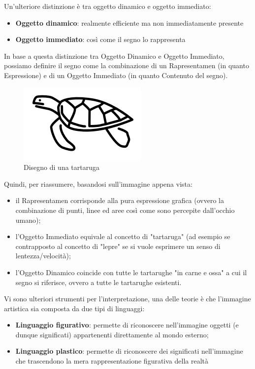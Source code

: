 \documentclass[11pt,a4paper]{article}
\begin{document}
Un'ulteriore distinzione è tra oggetto dinamico e oggetto immediato:
\begin{itemize}
	\item \textbf{Oggetto dinamico}: realmente efficiente ma non immediatamente presente
	\item \textbf{Oggetto immediato}: così come il segno lo rappresenta
\end{itemize}
In base a questa distinzione tra Oggetto Dinamico e Oggetto Immediato, possiamo definire il segno come la combinazione di un Rapresentamen (in quanto Espressione) e di un Oggetto Immediato (in quanto Contenuto del segno).
\begin{figure}
	\begin{center}
		\includegraphics[scale=0.6]{img/009.png}
	\end{center}
	\caption{Disegno di una tartaruga}
\end{figure}
Quindi, per riassumere, basandosi sull'immagine appena vista:
\begin{itemize}
	\item il Rapresentamen corrisponde alla pura espressione grafica (ovvero la combinazione di punti, linee ed aree così come sono percepite dall'occhio umano);
	\item l'Oggetto Immediato equivale al concetto di "tartaruga" (ad esempio se contrapposto al concetto di "lepre" se si vuole esprimere un senso di lentezza/velocità);
	\item l'Oggetto Dinamico coincide con tutte le tartarughe "in carne e ossa" a cui il segno si riferisce, ovvero a tutte le tartarughe esistenti.
\end{itemize}
Vi sono ulteriori strumenti per l'interpretazione, una delle teorie è che l'immagine artistica sia composta da due tipi di linguaggi:
\begin{itemize}
	\item \textbf{Linguaggio figurativo}:  permette di riconoscere nell'immagine oggetti (e dunque significati) appartenenti direttamente al mondo esterno;
	\item \textbf{Linguaggio plastico}: permette di riconoscere dei significati nell'immagine che trascendono la mera rappresentazione figurativa della realtà
\end{itemize}
\end{document}
